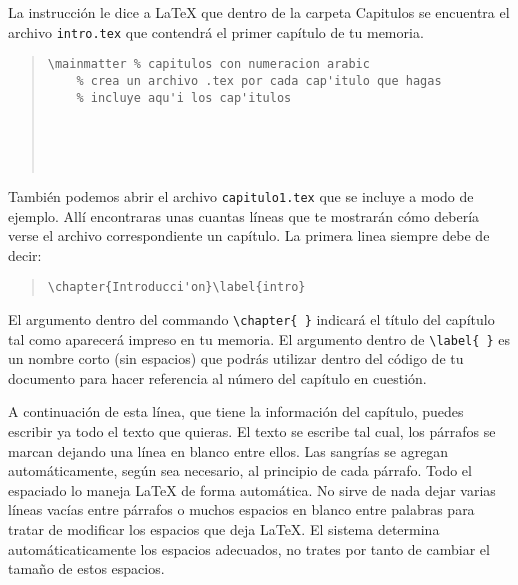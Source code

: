 La instrucci\'on \verb|| le dice a \LaTeX{} que dentro de la carpeta Capitulos
se encuentra el archivo \texttt{intro.tex} que contendr\'a el primer cap\'itulo de tu memoria.

\begin{quote}
\begin{verbatim}
\mainmatter % capitulos con numeracion arabic
 	% crea un archivo .tex por cada cap'itulo que hagas
	% incluye aqu'i los cap'itulos
	
 	
 	
 	 	
\end{verbatim}
\end{quote}

Tambi\'en podemos abrir el archivo \texttt{capitulo1.tex} que se incluye a modo de ejemplo. All\'i encontraras unas 
cuantas l\'ineas que te mostrar\'an c\'omo deber\'ia verse el archivo correspondiente un cap\'itulo. La primera linea siempre
debe de decir:

\begin{quote}
\begin{verbatim}
\chapter{Introducci'on}\label{intro}
\end{verbatim}
\end{quote}

El argumento dentro del commando \verb|\chapter{ }| indicar\'a el t\'itulo del cap\'itulo tal como aparecer\'a impreso 
en tu memoria. El argumento dentro de \verb|\label{ }| es un nombre corto (sin espacios) que podr\'as utilizar dentro
del c\'odigo de tu documento para hacer referencia al n\'umero del cap\'itulo en cuesti\'on.

A continuaci\'on de esta l\'inea, que tiene la informaci\'on del cap\'itulo, puedes escribir ya
todo el texto que quieras. El texto se escribe tal cual, los p\'arrafos se marcan dejando una l\'inea en blanco entre ellos. 
Las sangr\'ias se agregan autom\'aticamente, seg\'un sea necesario, al principio de cada p\'arrafo. Todo el
espaciado lo maneja \LaTeX{} de forma autom\'atica. No sirve de nada dejar varias l\'ineas vac\'ias entre p\'arrafos o muchos espacios en blanco entre palabras para tratar de modificar los espacios que deja \LaTeX{}. El sistema determina
autom\'aticaticamente los espacios adecuados, no trates por tanto de cambiar el tama\~no de estos espacios.

